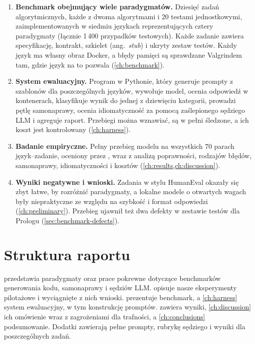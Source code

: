 \begin{enumerate}
  \item \textbf{Benchmark obejmujący wiele paradygmatów.} Dziesięć zadań algorytmicznych, każde
    z dwoma algorytmami i 20 testami jednostkowymi, zaimplementowanych w siedmiu językach
    reprezentujących cztery paradygmaty (łącznie 1\,400 przypadków testowych). Każde zadanie zawiera
    specyfikację, kontrakt, szkielet (ang.~\emph{stub}) i ukryty zestaw testów. Każdy język ma
    własny obraz Docker, a błędy pamięci są sprawdzane Valgrindem tam, gdzie język na to pozwala
    (\cref{ch:benchmark}).
  \item \textbf{System ewaluacyjny.} Program w Pythonie, który generuje prompty z szablonów dla
    poszczególnych języków, wywołuje model, ocenia odpowiedź w kontenerach, klasyfikuje wynik do
    jednej z dziewięciu kategorii, prowadzi pętlę samonaprawy, ocenia idiomatyczność za pomocą
    zaślepionego sędziego LLM i agreguje raport. Przebiegi można wznawiać, są w pełni śledzone,
    a ich koszt jest kontrolowany (\cref{ch:harness}).
  \item \textbf{Badanie empiryczne.} Pełny przebieg modelu \haiku{} na wszystkich 70 parach
    język--zadanie, oceniony przez \sonnet{}, wraz z analizą poprawności, rodzajów błędów,
    samonaprawy, idiomatyczności i kosztów (\cref{ch:results,ch:discussion}).
  \item \textbf{Wyniki negatywne i wnioski.} Zadania w stylu HumanEval okazały się zbyt łatwe, by
    rozróżnić paradygmaty, a lokalne modele o otwartych wagach były niepraktyczne ze względu na
    szybkość i format odpowiedzi (\cref{ch:preliminary}). Przebieg ujawnił też dwa defekty
    w zestawie testów dla Prologu (\cref{sec:benchmark-defects}).
\end{enumerate}

\section{Struktura raportu}

 przedstawia paradygmaty oraz prace pokrewne dotyczące benchmarków generowania
kodu, samonaprawy i sędziów LLM.  opisuje nasze eksperymenty pilotażowe
i wyciągnięte z nich wnioski.  prezentuje benchmark, a \cref{ch:harness} system
ewaluacyjny, w tym konstrukcję promptów.  zawiera wyniki, \cref{ch:discussion}
ich omówienie wraz z zagrożeniami dla trafności, a \cref{ch:conclusions} podsumowanie. Dodatki
zawierają pełne prompty, rubrykę sędziego i wyniki dla poszczególnych zadań.
